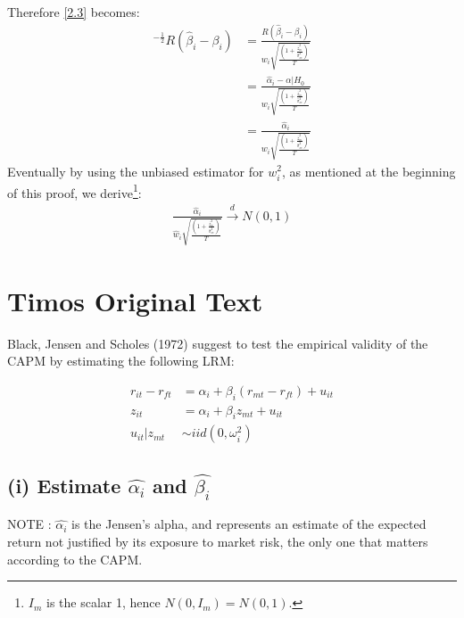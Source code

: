 \documentclass[]{article}
\begin{document}
Therefore \ref{2.3} becomes:
\begin{align*}
	[RV(\beta_i)R']^{-\frac{1}{2}}R(\hat{\beta}_i-\beta_i) &= \frac{R(\hat{\beta}_i-\beta_i)}{w_i\sqrt{\frac{(1 + \frac{\overline{z}_m^2}{\hat{\sigma}_{m}^2})}{T}}} \\
	&= \frac{\hat{\alpha}_i - \alpha|H_0}{w_i\sqrt{\frac{(1 + \frac{\overline{z}_m^2}{\hat{\sigma}_{m}^2})}{T}}} \\
	&= \frac{\hat{\alpha}_i}{w_i\sqrt{\frac{(1 + \frac{\overline{z}_m^2}{\hat{\sigma}_{m}^2})}{T}}}
\end{align*}
Eventually by using the unbiased estimator for $w_i^2$, as mentioned at the beginning of this proof, we derive\footnote{$I_m$ is the scalar 1, hence $N(0,I_m) = N(0,1)$.}: 
\begin{align}
	\frac{\hat{\alpha}_i}{\hat{w}_i\sqrt{\frac{(1 + \frac{\overline{z}_m^2}{\hat{\sigma}_{m}^2})}{T}}} \overset{d}{\to} N(0,1)
\end{align}

\section{Timos Original Text}
Black, Jensen and Scholes (1972) suggest to test the empirical validity of the CAPM by estimating the following LRM: 

\begin{align*}
	r_{it} - r_{ft} &= \alpha_i + \beta_i(r_{mt} - r_{ft}) + u_{it}\\
	z_{it} &= \alpha_i + \beta_i z_{mt} + u_{it}\\
	u_{it}|z_{mt} &\sim iid(0, \omega^2_i)
\end{align*}

\subsection{(i) Estimate $\hat{\alpha_i}$ and $\hat{\beta_i}$}
NOTE : $\hat{\alpha_i}$ is the Jensen’s alpha, and represents an estimate of the expected return not justified by its exposure to market risk, the only one that matters according to the CAPM.
\end{document}
